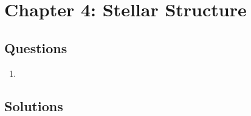 \section{Chapter 4: Stellar Structure}
\subsection{Questions}
\begin{enumerate}
\item 
\end{enumerate}

\subsection{Solutions}